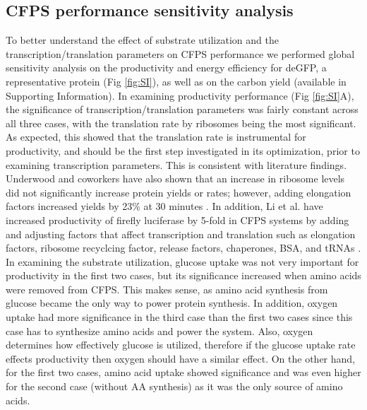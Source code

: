 \documentclass[journal=asbcd6,manuscript=article]{achemso}
\begin{document}
\subsection{CFPS performance sensitivity analysis}
To better understand the effect of substrate utilization and the transcription/translation parameters on CFPS performance we performed global sensitivity analysis on the productivity and energy efficiency for deGFP, a representative protein (Fig \ref{fig:SI}), as well as on the carbon yield (available in Supporting Information).
In examining productivity performance (Fig \ref{fig:SI}A), the significance of transcription/translation parameters was fairly constant across all three cases, with the translation rate by ribosomes being the most significant.
As expected, this showed that the translation rate is instrumental for productivity, and should be the first step investigated in its optimization, prior to examining transcription parameters.
This is consistent with literature findings.
Underwood and coworkers have also shown that an increase in ribosome levels did not significantly increase protein yields or rates; however, adding elongation factors increased yields by 23\% at 30 minutes \cite{2005_underwood_biotech}.
In addition, Li et al. have increased productivity of firefly luciferase by 5-fold in CFPS systems by adding and adjusting factors that affect transcription and translation such as elongation factors, ribosome recyclcing factor, release factors, chaperones, BSA, and tRNAs \cite{2014_li_PlosOne}.
In examining the substrate utilization, glucose uptake was not very important for productivity in the first two cases, but its significance increased when amino acids were removed from CFPS.
This makes sense, as amino acid synthesis from glucose became the only way to power protein synthesis.
In addition, oxygen uptake had more significance in the third case than the first two cases since this case has to synthesize amino acids and power the system. 
Also, oxygen determines how effectively glucose is utilized, therefore if the glucose uptake rate effects productivity then oxygen should have a similar effect.
On the other hand, for the first two cases, amino acid uptake showed significance and was even higher for the second case (without AA synthesis) as it was the only source of amino acids.
\end{document}
